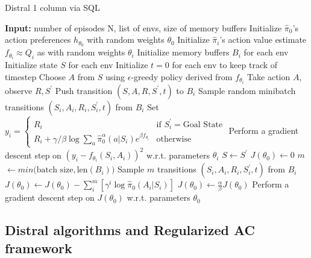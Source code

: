 \documentclass[12pt]{report}
\begin{document}
\begin{algorithm}[H]
\caption{Distral 1 column via SQL}\label{alg:dist1colSQL}
\small
\begin{algorithmic}[1]
\State \textbf{Input: } number of episodes N, list of envs, size of memory buffers
\State Initialize $\hat{\pi}_0$'s action preferences $h_{\theta_0}$ with random weights $\theta_0$
\State Initialize $\hat{\pi}_i$'s action value estimate $f_{\theta_i}\approx Q_i$ as with random weights $\theta_i$
\State Initialize memory buffers $B_i$ for each env
\State Initialize state $S$ for each env
\State Initialize $t = 0$ for each env to keep track of timestep
\State Choose $A$ from $S$ using $\epsilon$-greedy policy derived from $f_{\theta_i}$  \label{pi_logits}
\State Take action $A$, observe $R, S^\prime$
\State Push transition $(S,A,R,S^\prime,t)$ to $B_i$
 
\State Sample random minibatch transitions $(S_i,A_i,R_i,S_i^\prime,t)$ from $B_i$
\State Set $y_i = \begin{cases} R_i &\mbox{if } S_i^\prime = \text{Goal State} \\
R_i + \gamma/\beta \log \sum_a \hat{\pi}_0^\alpha(a|S_i)e^{\beta f_{\theta_i}}  & \mbox{otherwise} \end{cases} $
\State Perform a gradient descent step on $\left(y_i - f_{\theta_i}(S_i,A_i)\right)^2$ w.r.t. parameters $\theta_i$
\EndIf
\State $S \gets S^\prime$
\EndFor
\State $J(\theta_0) \gets 0$
 
\State $m$ $\gets min\big(\text{batch size}, \text{len}(B_i)\big)$
\State Sample $m$ transitions $(S_i,A_i,R_i,S_i^\prime,t)$ from $B_i$
\State $J(\theta_0) \gets J(\theta_0) - \sum_i^m\left[\gamma^i \log{\hat{\pi}_0(A_i | S_i)}\right]$
\EndFor
\State $J(\theta_0) \gets \frac{\alpha}{\beta}J(\theta_0)$ 
\State Perform a gradient descent step on $J(\theta_0)$ w.r.t. parameters $\theta_0$
\EndWhile
\end{algorithmic}
\end{algorithm}

\subsection{Distral algorithms and Regularized AC framework}
\end{document}
